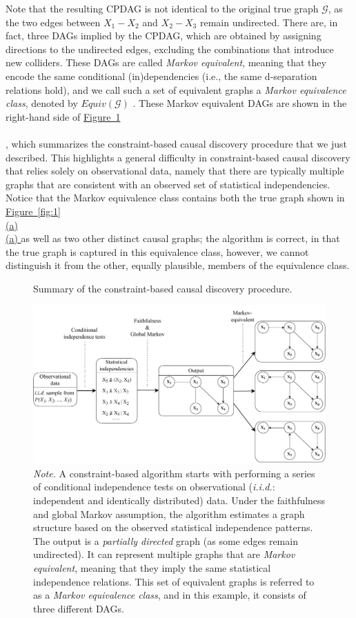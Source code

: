 \documentclass[twoside, 11pt]{article}
\newcommand*{\figref}[2][]{%
  \hyperref[{fig:#2}]{%
    Figure~\ref*{fig:#2}%
    \ifx\\#1\\%
    \else
      #1%
    \fi
  }%
}
\begin{document}
Note that the resulting CPDAG is not identical to the original true graph $\mathcal{G}$, as the two edges between $X_1 - X_2$ and $X_2 - X_3$ remain undirected. There are, in fact, three DAGs implied by the CPDAG, which are obtained by assigning directions to the undirected edges, excluding the combinations that introduce new colliders. These DAGs are called \textit{Markov equivalent}, meaning that they encode the same conditional (in)dependencies (i.e., the same d-separation relations hold), and we call such a set of equivalent graphs a \textit{Markov equivalence class}, denoted by $Equiv(\mathcal{G})$ \citep{spirtes2000}. These Markov equivalent DAGs are shown in the right-hand side of \figref{3}, which summarizes the constraint-based causal discovery procedure that we just described. This highlights a general difficulty in constraint-based causal discovery that relies solely on observational data, namely that there are typically multiple graphs that are consistent with an observed set of statistical independencies. Notice that the Markov equivalence class contains both the true graph shown in \figref[(a)]{1} as well as two other distinct causal graphs; the algorithm is correct, in that the true graph is captured in this equivalence class, however, we cannot distinguish it from the other, equally plausible, members of the equivalence class.


\begin{figure}[t]
    \centering
        \caption{Summary of the constraint-based causal discovery procedure.}
        \includegraphics[width=1.0\textwidth]{figures/Fig3.pdf}
        \vspace{0.1mm}
        \caption*{\small{\textit{Note.} A constraint-based algorithm starts with performing a series of conditional independence tests on observational (\textit{i.i.d.}: independent and identically distributed) data. Under the faithfulness and global Markov assumption, the algorithm estimates a graph structure based on the observed statistical independence patterns. The output is a \textit{partially directed} graph (as some edges remain undirected). It can represent multiple graphs that are \textit{Markov equivalent}, meaning that they imply the same statistical independence relations. This set of equivalent graphs is referred to as a \textit{Markov equivalence class}, and in this example, it consists of three different DAGs.}}
    \label{fig:3}
\end{figure}
\end{document}
